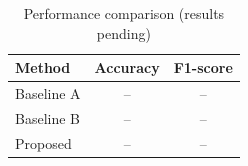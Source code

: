 \begin{table}[t]
\caption{Performance comparison (results pending)}
\label{tab:comparison}
\centering
\begin{tabular}{lcc}
\toprule
Method & Accuracy & F1-score \\
\midrule
Baseline A & -- & -- \\
Baseline B & -- & -- \\
Proposed & -- & -- \\
\bottomrule
\end{tabular}
\end{table}
